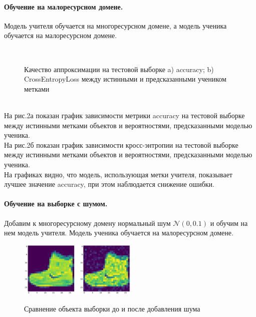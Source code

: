 \paragraph{Обучение на малоресурсном домене.}
Модель учителя обучается на многоресурсном домене, а модель ученика обучается на малоресурсном домене.\\
\begin{figure}[h!t]\center
{}
\\
\caption{Качество аппроксимации на тестовой выборке a) accuracy; b) CrossEntropyLoss между истинными и предсказанными учеником метками}
\end{figure}\\
На рис.2а показан график зависимости метрики accuracy на тестовой выборке между истинными метками объектов и вероятностями, предсказанными моделью ученика.\\
На рис.2б показан график зависимости кросс-энтропии на тестовой выборке между истинными метками объектов и вероятностями, предсказанными моделью ученика.\\
На графиках видно, что модель, использующая метки учителя, показывает лучшее значение accuracy, при этом наблюдается снижение ошибки.

\newpage
\paragraph{Обучение на выборке с шумом.}
Добавим к многоресурсному домену нормальный шум $\mathcal{N}(0,0.1)$ и обучим на нем модель учителя. Модель ученика обучается на малоресурсном домене.
\begin{figure}[h!t]\center
{\includegraphics[width=0.5\textwidth]{results/noise}}
\caption{Сравнение объекта выборки до и после добавления шума}
\end{figure}\\

